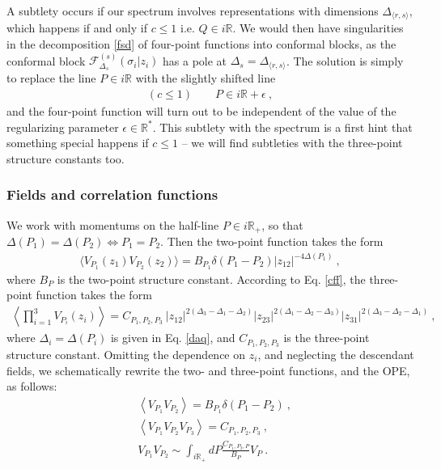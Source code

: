 \documentclass[12pt, a4paper, notitlepage, twoside]{report}
\numberwithin{equation}{section}
\theoremstyle{break}
\begin{document}
A subtlety occurs if our spectrum involves representations with dimensions $\Delta_{\langle r, s\rangle}$, which happens if and only if $c\leq 1$ i.e. $Q\in i\mathbb{R}$. 
We would then have singularities in the decomposition \eqref{fsd} of four-point functions into conformal blocks, as the conformal block $\mathcal{F}_{\Delta_s}^{(s)}(\sigma_i|z_i)$ has a pole at $\Delta_s = \Delta_{\langle r, s\rangle}$. 
The solution is simply to replace the line $P\in i\mathbb{R}$ with the slightly shifted line 
\begin{align}
 (c\leq 1) \qquad P \in i\mathbb{R} + \epsilon\ ,
\end{align}
and the four-point function will turn out to be independent of the value of the regularizing parameter $\epsilon \in \mathbb{R}^*$. 
This subtlety with the spectrum is a first hint that something special happens if $c\leq 1$ -- we will find subtleties with the three-point structure constants too. 


\subsubsection{Fields and correlation functions}

We work with momentums on the half-line $P\in i\mathbb{R}_+$, so that $\Delta(P_1)=\Delta(P_2)\iff P_1=P_2$. 
Then the two-point function takes the form
\begin{align}
 \Big\langle V_{P_1}(z_1) V_{P_2}(z_2)\Big\rangle = B_{P_1}\delta(P_1-P_2) |z_{12}|^{-4\Delta(P_1)}\ , 
\label{vvc}
\end{align}
where $B_P$ is the two-point structure constant. 
According to Eq. \eqref{cff}, the three-point function takes the form
\begin{align}
\left\langle \prod_{i=1}^3 V_{P_i}(z_i)\right\rangle = C_{P_1,P_2,P_3}\ |z_{12}|^{2(\Delta_3-\Delta_1-\Delta_2)} |z_{23}|^{2(\Delta_1-\Delta_2-\Delta_3)} |z_{31}|^{2(\Delta_3-\Delta_2-\Delta_1)}\ ,
\label{vvv}
\end{align}
where $\Delta_i = \Delta(P_i)$ is given in Eq. \eqref{daq}, and $C_{P_1,P_2,P_3}$ is the three-point structure constant. 
Omitting the dependence on $z_i$, and neglecting the descendant fields, we schematically rewrite the two- and three-point functions, and the OPE, as follows: 
\begin{align}
 &\boxed{\left\langle V_{P_1}V_{P_2} \right\rangle = B_{P_1}\delta(P_1-P_2) }\ ,
\label{vvss}
\\
 &\boxed{ \left\langle V_{P_1}V_{P_2}V_{P_3} \right\rangle = C_{P_1,P_2,P_3} }\ ,
\label{vvvs}
\\
 &\boxed{V_{P_1}V_{P_2} \sim \int_{i{\mathbb{R}_+}} dP \frac{C_{P_1,P_2,P}}{B_P} V_P}\ .
\label{vvi}
\end{align}
\end{document}
